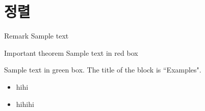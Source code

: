 \section{정렬}
\begin{frame}{\textbf{\currentname}}
    \begin{block}{Remark}
    Sample text
    \end{block}

    \begin{alertblock}{Important theorem}
    Sample text in red box
    \end{alertblock}

    \begin{examples}
    Sample text in green box. The title of the block is ``Examples".
    \end{examples}
    
    \begin{itemize}
        \item hihi
        \item hihihi
    \end{itemize}
\end{frame}
